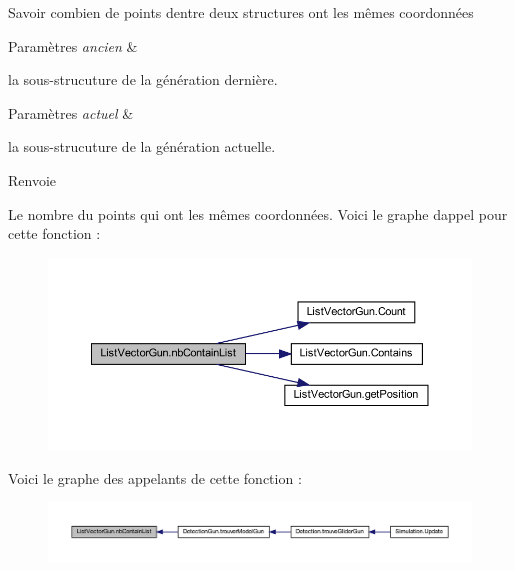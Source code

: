 Savoir combien de points d\textquotesingle{}entre deux structures ont les mêmes coordonnées 


\begin{DoxyParams}{Paramètres}
{\em ancien} & \\
\hline
\end{DoxyParams}
la sous-\/strucuture de la génération dernière. 
\begin{DoxyParams}{Paramètres}
{\em actuel} & \\
\hline
\end{DoxyParams}
la sous-\/strucuture de la génération actuelle. \begin{DoxyReturn}{Renvoie}

\end{DoxyReturn}
Le nombre du points qui ont les mêmes coordonnées. Voici le graphe d\textquotesingle{}appel pour cette fonction \+:
\nopagebreak
\begin{figure}[H]
\begin{center}
\leavevmode
\includegraphics[width=350pt]{class_list_vector_gun_a23dabaffda742276390b578c091d101a_cgraph}
\end{center}
\end{figure}
Voici le graphe des appelants de cette fonction \+:
\nopagebreak
\begin{figure}[H]
\begin{center}
\leavevmode
\includegraphics[width=350pt]{class_list_vector_gun_a23dabaffda742276390b578c091d101a_icgraph}
\end{center}
\end{figure}
\mbox{\label{class_list_vector_gun_a88c192bd1bdd5b6fb48ec38eb9ee8711}} 
